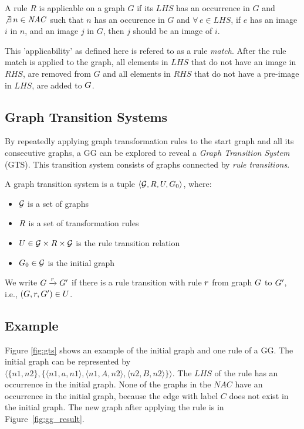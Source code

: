 A rule $R$ is applicable on a graph $G$ if its $\mathit{LHS}$ has an occurrence in $G$ and $\not\exists\,n \in \mathit{NAC}$ such that $n$ has an occurence in $G$ and $\forall\,e \in \mathit{LHS}$, if $e$ has an image $i$ in $n$, and an image $j$ in $G$, then $j$ should be an image of $i$.

This 'applicability' as defined here is refered to as a rule \textit{match}. After the rule match is applied to the graph, all elements in $\mathit{LHS}$ that do not have an image in $\mathit{RHS}$, are removed from $G$ and all elements in $\mathit{RHS}$ that do not have a pre-image in $\mathit{LHS}$, are added to $G$.

\subsection{Graph Transition Systems}
By repeatedly applying graph transformation rules to the start graph and all its consecutive graphs, a GG can be explored to reveal a \textit{Graph Transition System} (GTS). This transition system consists of graphs connected by \textit{rule transitions}.
\vspace{5px}
\begin{definition}
A graph transition system is a tuple	$\langle \mathcal{G}, R, U, G_0\rangle$, where:
\begin{itemize}
\item $\mathcal{G}$ is a set of graphs
\item $R$ is a set of transformation rules
\item $U \in \mathcal{G} \times R \times \mathcal{G}$ is the rule transition relation
\item $G_0 \in \mathcal{G}$ is the initial graph
\end{itemize}
We write $G \xrightarrow{r}G'$ if there is a rule transition with rule $r$ from graph $G$ to $G'$, i.e., $(G, r, G') \in U$.
\end{definition}

\subsection{Example}\label{sec:gts_example}
Figure \ref{fig:gts} shows an example of the initial graph and one rule of a GG. The initial graph can be represented by $\langle\{n1,n2\},\{\langle n1,a,n1\rangle, \langle n1,A,n2\rangle,\langle n2,B,n2\rangle\}\rangle$. The $\mathit{LHS}$ of the rule has an occurrence in the initial graph. None of the graphs in the $\mathit{NAC}$ have an occurrence in the initial graph, because the edge with label $C$ does not exist in the initial graph. The new graph after applying the rule is in Figure~\ref{fig:gg_result}.

